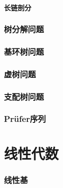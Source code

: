 \documentclass[12pt,a4paper]{article}
\begin{document}
\subsection{长链剖分}

\newpage
\section{树分解问题}

\newpage
\section{基环树问题}

\newpage
\section{虚树问题}

\newpage
\section{支配树问题}

\newpage
\section{Prüfer序列}

\newpage
\part{线性代数}
\section{线性基}
\end{document}
